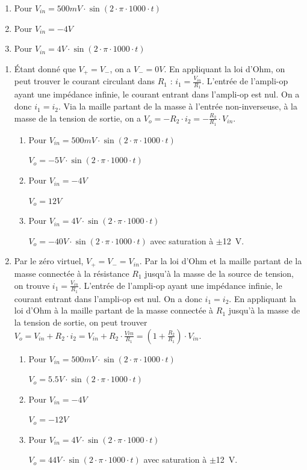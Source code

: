 \documentclass{../template/tp}
\begin{document}
{	\begin{enumerate}[label=\alph*)]
		\item Pour $V_{in} = 500 mV \cdot \sin(2\cdot \pi \cdot 1000 \cdot t)$
		\item Pour $V_{in} = -4V$
		\item Pour $V_{in} = 4V \cdot \sin(2\cdot \pi \cdot 1000 \cdot t)$
	\end{enumerate}
}
{
	\begin{enumerate}
		\item Étant donné que $V_+ = V_-$, on a $V_- = 0 V$. En appliquant la loi d'Ohm, on peut trouver le courant circulant dans $R_1$ : $i_1 = \frac{V_{in}}{R_1}$. L'entrée de l'ampli-op ayant une impédance infinie, le courant entrant dans l'ampli-op est nul. On a donc $i_1 = i_2$. Via la maille partant de la masse à l'entrée non-inverseuse, à la masse de la tension de sortie, on a $V_{o} = -R_2\cdot i_2 = -\frac{R_2}{R_1}\cdot V_{in}$.
		\begin{enumerate}[label=\alph*)]
			\item Pour $V_{in} = 500 mV \cdot \sin(2\cdot \pi \cdot 1000 \cdot t)$

			$V_o = -5V \cdot \sin(2\cdot \pi \cdot 1000 \cdot t)$

			\item Pour $V_{in} = -4V$

			$V_o = 12 V$

			\item Pour $V_{in} = 4V \cdot \sin(2\cdot \pi \cdot 1000 \cdot t)$

			$V_o = -40 V \cdot \sin(2\cdot \pi \cdot 1000 \cdot t)$ avec saturation à $\pm$12~V.
			
		\end{enumerate}
		\item  Par le zéro virtuel, $V_+ = V_- = V_{in}$.
		Par la loi d'Ohm et la maille partant de la masse connectée à la résistance $R_1$ jusqu'à la masse de la source de tension, on trouve $i_1 = \frac{V_{in}}{R_1}$.
		L'entrée de l'ampli-op ayant une impédance infinie, le courant entrant dans l'ampli-op est nul. On a donc $i_1 = i_2$.
		En appliquant la loi d'Ohm à la maille partant de la masse connectée à $R_1$ jusqu'à la masse de la tension de sortie, on peut trouver $V_o = V_{in} + R_2\cdot i_2 = V_{in} + R_2 \cdot \frac{V{in}}{R_1} = (1 + \frac{R_2}{R_1}) \cdot V_{in}$.
		\begin{enumerate}[label=\alph*)]
			\item Pour $V_{in} = 500 mV \cdot \sin(2\cdot \pi \cdot 1000 \cdot t)$

			$V_o = 5.5 V \cdot \sin(2\cdot \pi \cdot 1000 \cdot t)$

			\item Pour $V_{in} = -4V$

			$V_o = -12 V$

			\item Pour $V_{in} = 4V \cdot \sin(2\cdot \pi \cdot 1000 \cdot t)$

			$V_o = 44 V \cdot \sin(2\cdot \pi \cdot 1000 \cdot t)$ avec saturation à $\pm$12~V.
			
		\end{enumerate}
	\end{enumerate}
}
\end{document}
